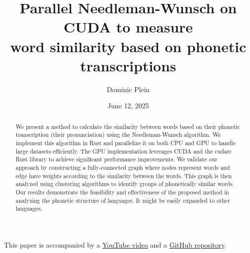 \documentclass[10pt,a4paper,english]{article}
\title{\vspace{-0.0em}Parallel Needleman-Wunsch on CUDA to measure\\
word similarity based on phonetic transcriptions}
\author{Dominic Plein}
\date{June 12, 2025}
\newcommand{\abstractText}{\noindent
	\newline\noindent
    We present a method to calculate the similarity between words based on their phonetic transcription (their pronunciation) using the Needleman-Wunsch algorithm. We implement this algorithm in Rust and parallelize it on both CPU and GPU to handle large datasets efficiently. The GPU implementation leverages CUDA and the cudarc Rust library to achieve significant performance improvements. We validate our approach by constructing a fully-connected graph where nodes represent words and edge have weights according to the similarity between the words. This graph is then analyzed using clustering algorithms to identify groups of phonetically similar words. Our results demonstrate the feasibility and effectiveness of the proposed method in analyzing the phonetic structure of languages. It might be easily expanded to other languages.
}
\begin{document}
\setlength{\abovedisplayskip}{0.2em}

\maketitle

\begin{abstract}
    \abstractText
    \newline
    \newline
\end{abstract}

\vspace{-2em}
\begin{center}
    This paper is accompanied by a \href{https://youtu.be/xbcpnItE3_4}{YouTube video} and a \href{https://github.com/Splines/phonetics-graph/}{GitHub repository}.
\end{center}

\begin{multicols*}{2}
\tableofcontents

\newcolumn


\vfill\null
\columnbreak




\end{multicols*}

\renewcommand*{\glsgroupskip}{} %
\printglossary[type=\acronymtype]

\printbibliography[
    heading=bibintoc,
    title={Bibliography},
    keyword={lit}
]
\printbibliography[
    title={Data sources \& Tools},
    keyword={data}
]
\end{document}

